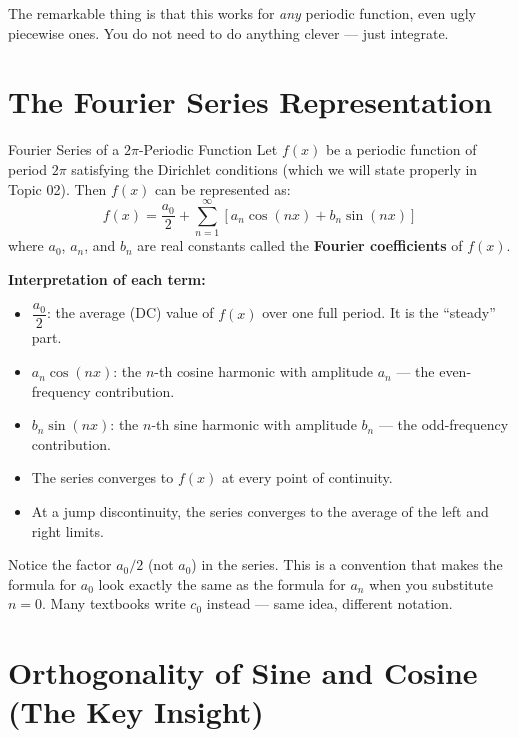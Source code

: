 \documentclass[12pt,a4paper]{article}
\begin{document}
The remarkable thing is that this works for \emph{any} periodic function, even ugly piecewise ones.
You do not need to do anything clever --- just integrate.

\section{The Fourier Series Representation}

\begin{infobox}{Fourier Series of a $2\pi$-Periodic Function}
Let $f(x)$ be a periodic function of period $2\pi$ satisfying the Dirichlet conditions (which we will state properly in Topic 02).
Then $f(x)$ can be represented as:
\[
f(x) = \frac{a_0}{2} + \sum_{n=1}^{\infty}\left[a_n\cos(nx) + b_n\sin(nx)\right]
\]
where $a_0$, $a_n$, and $b_n$ are real constants called the \textbf{Fourier coefficients} of $f(x)$.

\medskip

\textbf{Interpretation of each term:}
\begin{itemize}
  \item $\dfrac{a_0}{2}$: the average (DC) value of $f(x)$ over one full period. It is the ``steady'' part.
  \item $a_n \cos(nx)$: the $n$-th cosine harmonic with amplitude $a_n$ --- the even-frequency contribution.
  \item $b_n \sin(nx)$: the $n$-th sine harmonic with amplitude $b_n$ --- the odd-frequency contribution.
  \item The series converges to $f(x)$ at every point of continuity.
  \item At a jump discontinuity, the series converges to the average of the left and right limits.
\end{itemize}
\end{infobox}

Notice the factor $a_0/2$ (not $a_0$) in the series.
This is a convention that makes the formula for $a_0$ look exactly the same as the formula for $a_n$ when you substitute $n=0$.
Many textbooks write $c_0$ instead --- same idea, different notation.

\section{Orthogonality of Sine and Cosine (The Key Insight)}
\end{document}
